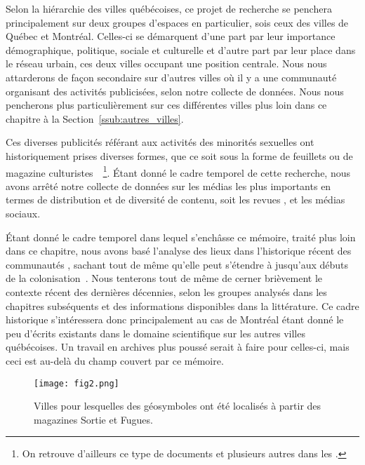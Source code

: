 Selon la hiérarchie des villes québécoises, ce projet de recherche se penchera principalement sur deux groupes d'espaces en particulier, sois ceux des villes de Québec et Montréal. 
Celles-ci se démarquent d'une part par leur importance démographique, politique, sociale et culturelle et d'autre part par leur place dans le réseau urbain, ces deux villes occupant une position centrale. 
Nous nous attarderons de façon secondaire sur d'autres villes où il y a une communauté \lgbt{} organisant des activités publicisées, selon notre collecte de données. 
Nous nous pencherons plus particulièrement sur ces différentes villes plus loin dans ce chapitre à la Section~\ref{ssub:autres_villes}.

Ces diverses publicités référant aux activités des minorités sexuelles ont historiquement prises diverses formes, que ce soit sous la forme de feuillets ou de magazine culturistes~\citep{Higgins1999}~\footnote{On retrouve d'ailleurs ce   type de documents et plusieurs autres dans les \agq{}.}. 
Étant donné le cadre temporel de cette recherche, nous avons arrêté notre collecte de données sur les médias les plus importants en termes de distribution et de diversité de contenu, soit les revues \fugues{}, \sortie{} et les médias sociaux. 

Étant donné le cadre temporel dans lequel s’enchâsse ce mémoire, traité plus loin dans ce chapitre, nous avons basé l'analyse des lieux dans l'historique récent des communautés \lgbt{}, sachant tout de même qu'elle peut s'étendre à jusqu'aux débuts de la colonisation~\citep{Higgins1999}.
Nous tenterons tout de même de cerner brièvement le contexte récent des dernières décennies, selon les groupes analysés dans les chapitres subséquents et des informations disponibles dans la littérature. 
Ce cadre historique s'intéressera donc principalement au cas de Montréal étant donné le peu d'écrits existants dans le domaine scientifique sur les autres villes québécoises. 
Un travail en archives plus poussé serait à faire pour celles-ci, mais ceci est au-delà du champ couvert par ce mémoire.

\begin{figure}[ht]
	\begin{center}
		\texttt{[image: fig2.png]}
	\end{center}
	\caption{Villes pour lesquelles des géosymboles ont été localisés à partir des
    magazines Sortie et Fugues.}\label{fig:carte_quebec}
\end{figure}

